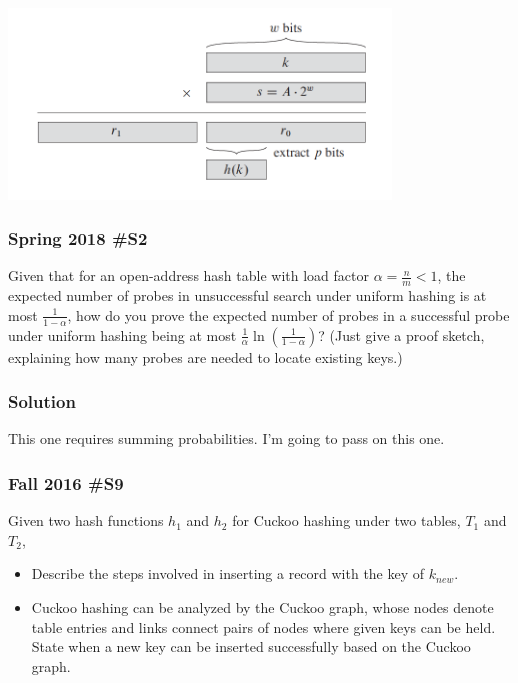 \includegraphics[width=4in]{Cormen_Figure_11_4.png}

\subsubsection{Spring 2018 \#S2}

Given that for an open-address hash table with load factor $\displaystyle \alpha = \frac{n}{m} < 1$, the expected number of probes in unsuccessful search under uniform hashing is at most $\displaystyle \frac{1}{1-\alpha}$, how do you prove the expected number of probes in a successful probe under uniform hashing being at most $\displaystyle \frac{1}{\alpha} \ln \left( \frac{1}{1-\alpha}\right)$?  (Just give a proof sketch, explaining how many probes are needed to locate existing keys.)

\subsubsection{Solution}

This one requires summing probabilities.  I'm going to pass on this one.  

\subsubsection{Fall 2016 \#S9}

Given two hash functions $h_1$ and $h_2$ for Cuckoo hashing under two tables, $T_1$ and $T_2$, 
	\begin{itemize}
		\item Describe the steps involved in inserting a record with the key of $k_{new}$.
		\item Cuckoo hashing can be analyzed by the Cuckoo graph, whose nodes denote table entries and links connect pairs of nodes where given keys can be held.  State when a new key can be inserted successfully based on the Cuckoo graph.
	\end{itemize}

